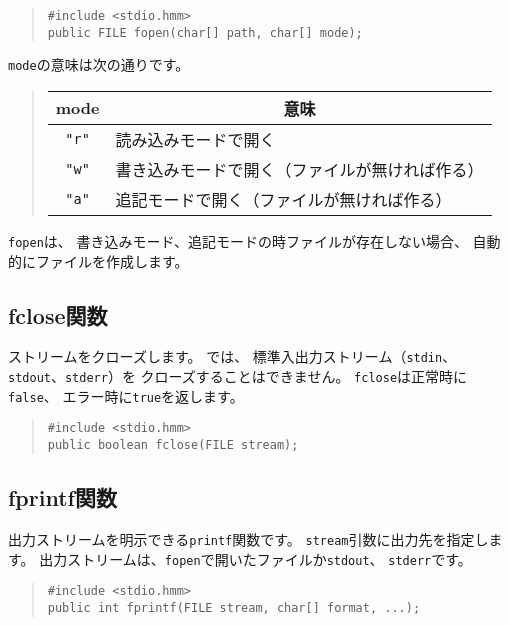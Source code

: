 \begin{quote}
\begin{verbatim}
#include <stdio.hmm>
public FILE fopen(char[] path, char[] mode);
\end{verbatim}
\end{quote}

\verb/mode/の意味は次の通りです。

\begin{quote}
\begin{tabular}{c|l}
\multicolumn{1}{c|}{mode} & \multicolumn{1}{c}{意味} \\\hline
\verb/"r"/ & 読み込みモードで開く \\
\verb/"w"/ & 書き込みモードで開く（ファイルが無ければ作る） \\
\verb/"a"/ & 追記モードで開く（ファイルが無ければ作る）
\end{tabular}
\end{quote}

\verb/fopen/は、
書き込みモード、追記モードの時ファイルが存在しない場合、
自動的にファイルを作成します。

\subsection{fclose関数}

ストリームをクローズします。
\tacos では、
標準入出力ストリーム（\verb/stdin/、\verb/stdout/、\verb/stderr/）を
クローズすることはできません。
\verb/fclose/は正常時に\verb/false/、
エラー時に\verb/true/を返します。

\begin{quote}
\begin{verbatim}
#include <stdio.hmm>
public boolean fclose(FILE stream);
\end{verbatim}
\end{quote}

\subsection{fprintf関数}

出力ストリームを明示できる\verb/printf/関数です。
\verb/stream/引数に出力先を指定します。
出力ストリームは、\verb/fopen/で開いたファイルか\verb/stdout/、
\verb/stderr/です。

\begin{quote}
\begin{verbatim}
#include <stdio.hmm>
public int fprintf(FILE stream, char[] format, ...);
\end{verbatim}
\end{quote}


